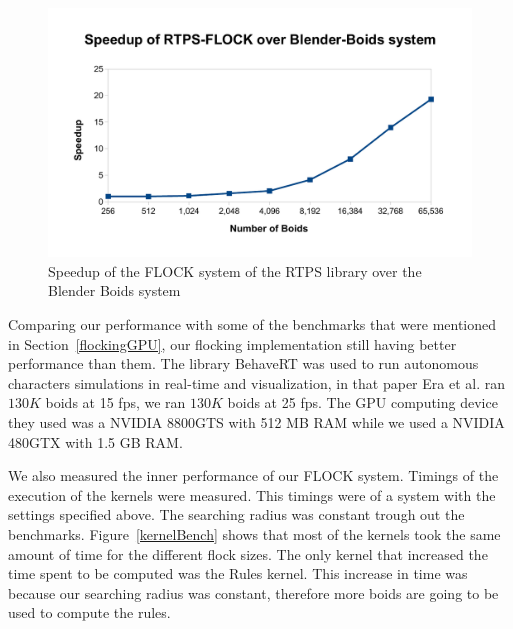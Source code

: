 \begin{figure}[htbp]
\begin{center}
\includegraphics[scale=0.7]{figures/speedup.pdf}
\caption{Speedup of the FLOCK system of the RTPS library over the Blender Boids system}
\label{speedup}
\end{center}
\end{figure}

Comparing our performance with some of the benchmarks that were mentioned in Section~\ref{flockingGPU}, our flocking implementation still having better performance than them. The library BehaveRT was used to run autonomous characters simulations in real-time and visualization, in that paper Era et al. ran $130K$ boids at 15 fps, we ran $130K$ boids at 25 fps. The GPU computing device they used was a NVIDIA 8800GTS with 512 MB RAM while we used a NVIDIA 480GTX with 1.5 GB RAM. 

We also measured the inner performance of our FLOCK system. Timings of the execution of the kernels were measured. This timings were of a system with the settings specified above. The searching radius was constant trough out the benchmarks. Figure~\ref{kernelBench} shows that most of the kernels took the same amount of time for the different flock sizes. The only kernel that increased the time spent to be computed was the Rules kernel. This increase in time was because our searching radius was constant, therefore more boids are going to be used to compute the rules.

